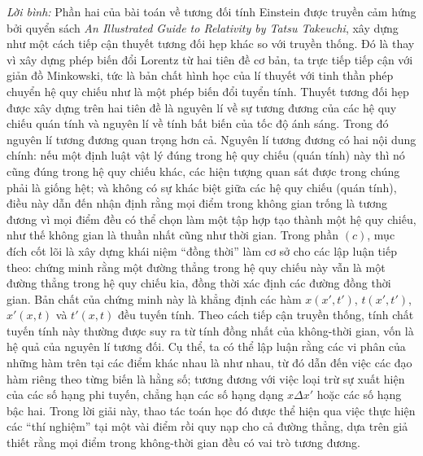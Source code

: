 \emph{Lời bình:} \newline Phần hai của bài toán về tương đối tính Einstein được truyền cảm hứng bởi quyển sách \emph{An Illustrated Guide to Relativity by Tatsu Takeuchi}, xây dựng như một cách tiếp cận thuyết tương đối hẹp khác so với truyền thống. Đó là thay vì xây dựng phép biến đổi Lorentz từ hai tiên đề cơ bản, ta trực tiếp tiếp cận với giản đồ Minkowski, tức là bản chất hình học của lí thuyết với tinh thần phép chuyển hệ quy chiếu như là một phép biến đổi tuyển tính.\newline
Thuyết tương đối hẹp được xây dựng trên hai tiên đề là nguyên lí về sự tương đương của các hệ quy chiếu quán tính và nguyên lí về tính bất biến của tốc độ ánh sáng. Trong đó nguyên lí tương đương quan trọng hơn cả. Nguyên lí tương đương có hai nội dung chính: nếu một định luật vật lý đúng trong hệ quy chiếu (quán tính) này thì nó cũng đúng trong hệ quy chiếu khác, các hiện tượng quan sát được trong chúng phải là giống hệt; và không có sự khác biệt giữa các hệ quy chiếu (quán tính), điều này dẫn đến nhận định rằng mọi điểm trong không gian trống là tương đương vì mọi điểm đều có thể chọn làm một tập hợp tạo thành một hệ quy chiếu, như thế không gian là thuần nhất cũng như thời gian.\newline
Trong phần $(c)$, mục đích cốt lõi là xây dựng khái niệm ``đồng thời'' làm cơ sở cho các lập luận tiếp theo: chứng minh rằng một đường thẳng trong hệ quy chiếu này vẫn là một đường thẳng trong hệ quy chiếu kia, đồng thời xác định các đường đồng thời gian. Bản chất của chứng minh này là khẳng định các hàm $x(x',t')$, $t(x',t')$, $x'(x,t)$ và $t'(x,t)$ đều tuyến tính. Theo cách tiếp cận truyền thống, tính chất tuyến tính này thường được suy ra từ tính đồng nhất của không-thời gian, vốn là hệ quả của nguyên lí tương đối. Cụ thể, ta có thể lập luận rằng các vi phân của những hàm trên tại các điểm khác nhau là như nhau, từ đó dẫn đến việc các đạo hàm riêng theo từng biến là hằng số; tương đương với việc loại trừ sự xuất hiện của các số hạng phi tuyến, chẳng hạn các số hạng dạng $x\Delta x'$ hoặc các số hạng bậc hai. Trong lời giải này, thao tác toán học đó được thể hiện qua việc thực hiện các ``thí nghiệm'' tại một vài điểm rồi quy nạp cho cả đường thẳng, dựa trên giả thiết rằng mọi điểm trong không-thời gian đều có vai trò tương đương.\newline
